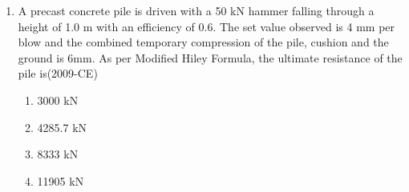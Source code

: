 \documentclass[journal,12pt,twocolumn]{IEEEtran}
\theoremstyle{remark}
\begin{document}
\begin{enumerate}
\item A precast concrete pile is driven with a 50 kN hammer falling through a height of 1.0 m with an efficiency of 0.6. The set value observed is 4 mm per blow and the combined temporary compression of the pile, cushion and the ground is 6mm. As per Modified Hiley Formula, the ultimate resistance of the pile is\hfill{(2009-CE)}

	\begin{enumerate}
		\item 3000 kN
		\item 4285.7 kN
	    \item 8333 kN
		\item 11905 kN
	\end{enumerate}






\end{enumerate}
\end{document}
